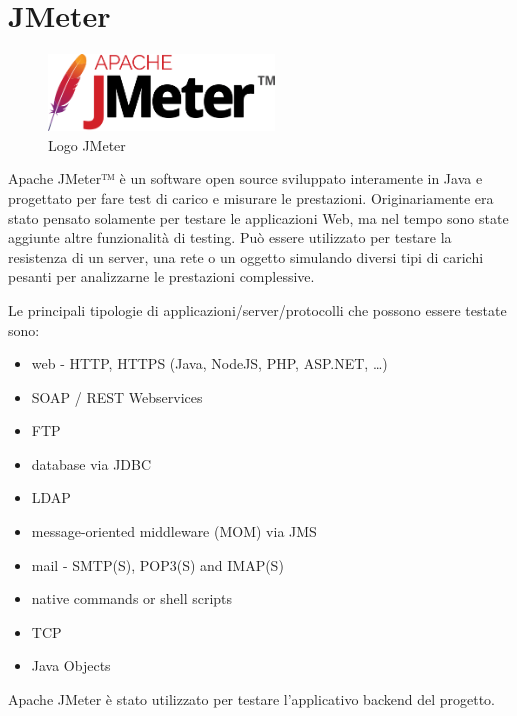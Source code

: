 \section{JMeter}
\begin{figure}[ht!]
\begin{center}
  \includegraphics[width=6cm]{images/jmeter_logo.png}
  \caption{Logo JMeter}
\end{center}
\end{figure}
\FloatBarrier
Apache JMeter™ è un software open source sviluppato interamente in Java e progettato per fare test di carico e misurare le prestazioni. Originariamente era stato pensato solamente per testare le applicazioni Web, ma nel tempo sono state aggiunte altre funzionalità di testing. 
Può essere utilizzato per testare la resistenza di un server, una rete o un oggetto simulando diversi tipi di carichi pesanti per analizzarne le prestazioni complessive.

Le principali tipologie di applicazioni/server/protocolli che possono essere testate sono:
\begin{itemize}
    \item web - HTTP, HTTPS (Java, NodeJS, PHP, ASP.NET, …)
    \item SOAP / REST Webservices
    \item FTP
    \item database via JDBC
    \item LDAP
    \item message-oriented middleware (MOM) via JMS
    \item mail - SMTP(S), POP3(S) and IMAP(S)
    \item native commands or shell scripts
    \item TCP
    \item Java Objects
\end{itemize}
\cite{JMETER} 
Apache JMeter è stato utilizzato per testare l'applicativo backend del progetto.